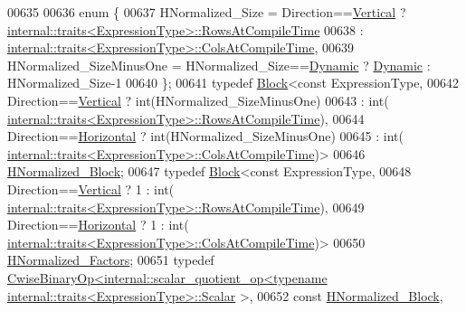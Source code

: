 \begin{DoxyCode}
00635 
00636     \textcolor{keyword}{enum} \{
00637       HNormalized\_Size = Direction==\hyperlink{group__enums_ggad49a7b3738e273eb00932271b36127f7addca718e0564723df21d61b94b1198be}{Vertical} ? 
      \hyperlink{struct_eigen_1_1internal_1_1traits}{internal::traits<ExpressionType>::RowsAtCompileTime}
00638                                              : 
      \hyperlink{struct_eigen_1_1internal_1_1traits}{internal::traits<ExpressionType>::ColsAtCompileTime},
00639       HNormalized\_SizeMinusOne = HNormalized\_Size==\hyperlink{namespace_eigen_ad81fa7195215a0ce30017dfac309f0b2}{Dynamic} ? \hyperlink{namespace_eigen_ad81fa7195215a0ce30017dfac309f0b2}{Dynamic} : HNormalized\_Size-1
00640     \};
00641     \textcolor{keyword}{typedef} \hyperlink{group___core___module_class_eigen_1_1_block}{Block}<\textcolor{keyword}{const} ExpressionType,
00642                   Direction==\hyperlink{group__enums_ggad49a7b3738e273eb00932271b36127f7addca718e0564723df21d61b94b1198be}{Vertical}   ? int(HNormalized\_SizeMinusOne)
00643                                         : int(
      \hyperlink{struct_eigen_1_1internal_1_1traits}{internal::traits<ExpressionType>::RowsAtCompileTime}),
00644                   Direction==\hyperlink{group__enums_ggad49a7b3738e273eb00932271b36127f7aae8a16b3b9272683c1162915f6d892be}{Horizontal} ? int(HNormalized\_SizeMinusOne)
00645                                         : int(
      \hyperlink{struct_eigen_1_1internal_1_1traits}{internal::traits<ExpressionType>::ColsAtCompileTime})>
00646             \hyperlink{group___core___module_class_eigen_1_1_block}{HNormalized\_Block};
00647     \textcolor{keyword}{typedef} \hyperlink{group___core___module_class_eigen_1_1_block}{Block}<\textcolor{keyword}{const} ExpressionType,
00648                   Direction==\hyperlink{group__enums_ggad49a7b3738e273eb00932271b36127f7addca718e0564723df21d61b94b1198be}{Vertical}   ? 1 : int(
      \hyperlink{struct_eigen_1_1internal_1_1traits}{internal::traits<ExpressionType>::RowsAtCompileTime}),
00649                   Direction==\hyperlink{group__enums_ggad49a7b3738e273eb00932271b36127f7aae8a16b3b9272683c1162915f6d892be}{Horizontal} ? 1 : int(
      \hyperlink{struct_eigen_1_1internal_1_1traits}{internal::traits<ExpressionType>::ColsAtCompileTime})>
00650             \hyperlink{group___core___module_class_eigen_1_1_block}{HNormalized\_Factors};
00651     \textcolor{keyword}{typedef} 
      \hyperlink{group___core___module_class_eigen_1_1_cwise_binary_op}{CwiseBinaryOp<internal::scalar\_quotient\_op<typename internal::traits<ExpressionType>::Scalar}
      >,
00652                 \textcolor{keyword}{const} \hyperlink{group___core___module_class_eigen_1_1_block}{HNormalized\_Block},

\end{DoxyCode}
